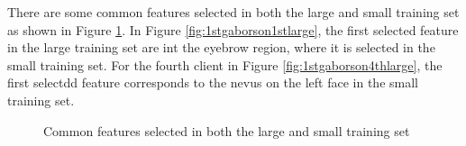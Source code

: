 There are some common features selected in both the large and small training set as shown in \mbox{Figure} \ref{fig:resultslarge14}. In \mbox{Figure} \ref{fig:1stgaborson1stlarge}, the first selected feature in the large training set are int the eyebrow region, where it is selected in the small training set. For the fourth client in \mbox{Figure} \ref{fig:1stgaborson4thlarge}, the first selectdd feature corresponds to the nevus on the left face in the small training set. 
\begin{figure}
\begin{center}
 \caption{Common features selected in both the large and small training set }
\label{fig:resultslarge14}
\end{center}
\end{figure}
